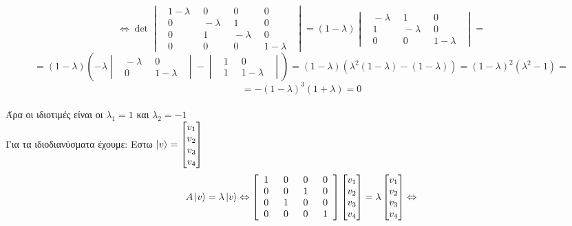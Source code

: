 \documentclass[12pt]{article}
\begin{document}
$$ \Leftrightarrow\det \begin{vmatrix} \;\;1-\lambda &\;\; 0 &\;\; 0&\;\; 0\;\; \\
    \;\;0 &\;\;- \lambda &\;\; 1&\;\; 0\;\;\\
    \;\;0 &\;\; 1&\;\; -\lambda&\;\; 0\;\;\\
    \;\;0 &\;\; 0 &\;\; 0&\;\;1- \lambda\;\;   \end{vmatrix} = (1-\lambda )
    \begin{vmatrix} \;\;-\lambda &\;\; 1 &\;\; 0\;\; \\
        \;\;1 &\;\; -\lambda &\;\; 0\;\;\\
        \;\;0 &\;\; 0&\;\; 1-\lambda\;\;
     \end{vmatrix}=$$
     $$=  (1-\lambda )(-\lambda \begin{vmatrix} \;\;-\lambda &\;\; 0\;\; \\
        \;\; 0&\;\; 1-\lambda\;\;
     \end{vmatrix} - \begin{vmatrix} \;\;1 &\;\; 0\;\; \\
        \;\; 1&\;\; 1-\lambda\;\;
     \end{vmatrix}
     )=  (1-\lambda )(\lambda^2 (1-\lambda) -(1-\lambda))=(1-\lambda)^2(\lambda^2-1)=$$
     $$=-(1-\lambda)^3(1+\lambda)=0 $$ \\
Άρα οι ιδιοτιμές είναι οι $\lambda_1 = 1$ και $\lambda_2=-1$ \\
Για τα ιδιοδιανύσματα έχουμε:
Εστω $\ket{v}=\begin{bmatrix} v_1 \\ v_2\\v_3\\v_4\end{bmatrix}$
$$A\ket{v}=\lambda\ket{ v} \Leftrightarrow \begin{bmatrix} \;\;1 &\;\; 0 &\;\; 0&\;\; 0\;\; \\
    \;\;0 &\;\; 0 &\;\; 1&\;\; 0\;\;\\
    \;\;0 &\;\; 1 &\;\; 0&\;\; 0\;\;\\
    \;\;0 &\;\; 0 &\;\; 0&\;\; 1\;\;      \end{bmatrix} \begin{bmatrix} v_1 \\ v_2\\v_3\\v_4 \end{bmatrix}=\lambda\begin{bmatrix} v_1 \\ v_2\\v_3\\v_4\end{bmatrix} \Leftrightarrow $$
\end{document}
